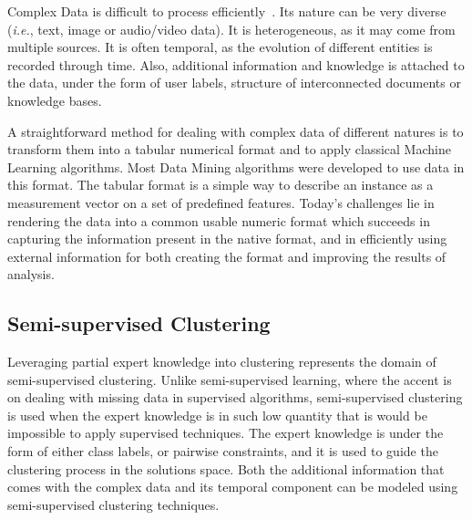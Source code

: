 \documentclass{article}
\begin{document}
Complex Data is difficult to process efficiently~\cite{ZIG09}.
Its nature can be very diverse (\textit{i.e.}, text, image or audio/video data).
It is heterogeneous, as it may come from multiple sources.
It is often temporal, as the evolution of different entities is recorded through time.
Also, additional information and knowledge is attached to the data, under the form of user labels, structure of interconnected documents or knowledge bases.

A straightforward method for dealing with complex data of different natures is to transform them into a tabular numerical format and to apply classical Machine Learning algorithms.
Most Data Mining algorithms were developed to use data in this format.
The tabular format is a simple way to describe an instance as a measurement vector on a set of predefined features.
Today's challenges lie in rendering the data into a common usable numeric format which succeeds in capturing the information present in the native format, and in efficiently using external information for both creating the format and improving the results of analysis.

\subsection{Semi-supervised Clustering}

Leveraging partial expert knowledge into clustering represents the domain of semi-supervised clustering.
Unlike semi-supervised learning, where the accent is on dealing with missing data in supervised algorithms, semi-supervised clustering is used when the expert knowledge is in such low quantity that is would be impossible to apply supervised techniques.
The expert knowledge is under the form of either class labels, or pairwise constraints,
and it is used to guide the clustering process in the solutions space.
Both the additional information that comes with the complex data and its temporal component can be modeled using semi-supervised clustering techniques.
\end{document}
